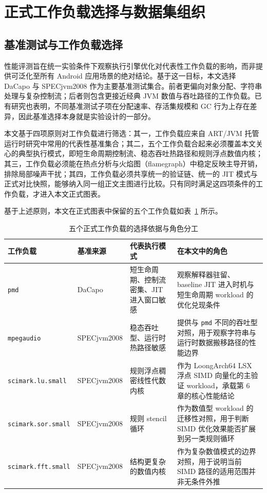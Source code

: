 \section{正式工作负载选择与数据集组织}

\subsection{基准测试与工作负载选择}

性能评测旨在统一实验条件下观察执行引擎优化对代表性工作负载的影响，而非提供可泛化至所有 Android 应用场景的绝对结论。基于这一目标，本文选择 DaCapo 与 SPECjvm2008 作为主要基准测试集合\citep{Blackburn2006,SPECjvm2008}。前者更偏向对象分配、字符串处理与复杂控制流；后者则包含更接近经典 JVM 数值与吞吐路径的工作负载。已有研究也表明，不同基准测试子项在分配速率、存活集规模和 GC 行为上存在差异，因此基准选择本身就是实验设计的一部分\citep{Lengauer2017GCBench,Prokopec2019Renaissance}。

本文基于四项原则对工作负载进行筛选：其一，工作负载应来自 ART/JVM 托管运行时研究中常用的代表性基准集合；其二，五个工作负载合起来必须覆盖本文关心的典型执行模式，即短生命周期控制流、稳态吞吐热路径和规则浮点数值内核；其三，工作负载必须能在热点分析与火焰图（flamegraph）中稳定反映主导开销，排除局部噪声干扰；其四，工作负载必须共享统一的验证链、统一的 JIT 模式与正式对比快照，能够纳入同一组正文主图进行比较。只有同时满足这四项条件的工作负载，才进入本文正式图表。

基于上述原则，本文在正式图表中保留的五个工作负载如表~\ref{tab:formal-workload-selection} 所示。

\begin{table}[htbp]
    \centering
    \scriptsize
    \caption{五个正式工作负载的选择依据与角色分工}
    \label{tab:formal-workload-selection}
    \begin{tabular}{>{\raggedright\arraybackslash}p{3.0cm}>{\raggedright\arraybackslash}p{2.1cm}>{\raggedright\arraybackslash}p{3.3cm}>{\raggedright\arraybackslash}p{4.2cm}}
        \toprule
        \textbf{工作负载} & \textbf{基准来源} & \textbf{代表执行模式} & \textbf{在本文中的角色} \\
        \midrule
        \texttt{pmd} & DaCapo & 短生命周期、控制流密集、JIT 进入窗口敏感 & 观察解释器驻留、baseline JIT 进入时机与短生命周期 workload 的优化兑现条件 \\
        \texttt{mpegaudio} & SPECjvm2008 & 稳态吞吐型、运行时热路径敏感 & 提供与 \texttt{pmd} 不同的吞吐型对照，用于观察字符串与运行时数据搬移路径的性能边界 \\
        \texttt{scimark.lu.small} & SPECjvm2008 & 规则浮点稠密线性代数内核 & 作为 LoongArch64 LSX 浮点 SIMD 向量化的主验证 workload，承载第 6 章的核心性能结论 \\
        \texttt{scimark.sor.small} & SPECjvm2008 & 规则 stencil 循环 & 作为数值型 workload 的迁移性对照，用于判断 SIMD 优化效果能否扩展到另一类规则循环 \\
        \texttt{scimark.fft.small} & SPECjvm2008 & 结构更复杂的数值内核 & 作为复杂数值模式的边界对照，用于说明当前 SIMD 路径的适用范围并非无条件外推 \\
        \bottomrule
    \end{tabular}
\end{table}

